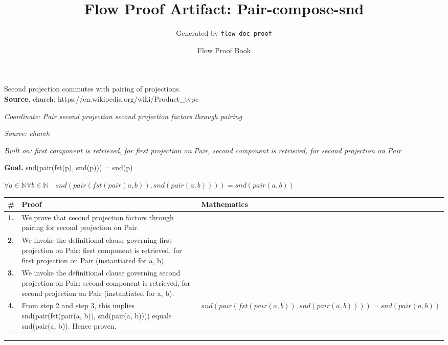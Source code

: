 \documentclass[11pt]{article}
\title{Flow Proof Artifact: Pair-compose-snd}
\author{Generated by \texttt{flow doc proof}}
\date{Flow Proof Book}
\theoremstyle{definition}
\begin{document}
\maketitle
Second projection commutes with pairing of projections.\\[0.5em]
\textbf{Source.} church: https://en.wikipedia.org/wiki/Product\_type\\[0.5em]
\bigskip
{}\par
\smallskip\noindent\textit{Coordinate: Pair \cdot second projection \cdot second projection factors through pairing}\par
\smallskip\noindent\textit{Source: church}\par
\smallskip\noindent\textit{Built on: first component is retrieved, for first projection on Pair, second component is retrieved, for second projection on Pair}\par
\medskip
\noindent\textbf{Goal.} snd(pair(fst(p), snd(p))) = snd(p)\par
\noindent$\displaystyle \forall a \in \mathbb{N} \forall b \in \mathbb{N}\quad snd(pair(fst(pair(a, b)), snd(pair(a, b)))) = snd(pair(a, b))$\par
\medskip
\noindent
\begin{tabular}{@{} >{\raggedright\arraybackslash}p{} >{\raggedright\arraybackslash}p{} >{\raggedleft\arraybackslash}p{} @{}}
\textbf{\#} & \textbf{Proof} & \textbf{Mathematics} \\
\midrule
\textbf{1.} & We prove that second projection factors through pairing for second projection on Pair. & \\[0.45em]
\textbf{2.} & We invoke the definitional clause governing first projection on Pair: first component is retrieved, for first projection on Pair (instantiated for a, b). & \\[0.45em]
\textbf{3.} & We invoke the definitional clause governing second projection on Pair: second component is retrieved, for second projection on Pair (instantiated for a, b). & \\[0.45em]
\textbf{4.} & From step 2 and step 3, this implies snd(pair(fst(pair(a, b)), snd(pair(a, b)))) equals snd(pair(a, b)). Hence proven. & $\displaystyle snd(pair(fst(pair(a, b)), snd(pair(a, b)))) = snd(pair(a, b))$ \\[0.45em]
\bottomrule
\end{tabular}
\label{thm:Pair-second projection-second_projection_factors_through_pairing}
\par\medskip\hrule
\end{document}
